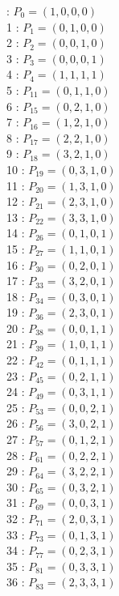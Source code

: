 \documentclass{article}
\begin{document}
{\begin{multicols}{3}
 : $P_{0}=( 1, 0, 0, 0 )$\\
1 : $P_{1}=( 0, 1, 0, 0 )$\\
2 : $P_{2}=( 0, 0, 1, 0 )$\\
3 : $P_{3}=( 0, 0, 0, 1 )$\\
4 : $P_{4}=( 1, 1, 1, 1 )$\\
5 : $P_{11}=( 0, 1, 1, 0 )$\\
6 : $P_{15}=( 0, 2, 1, 0 )$\\
7 : $P_{16}=( 1, 2, 1, 0 )$\\
8 : $P_{17}=( 2, 2, 1, 0 )$\\
9 : $P_{18}=( 3, 2, 1, 0 )$\\
10 : $P_{19}=( 0, 3, 1, 0 )$\\
11 : $P_{20}=( 1, 3, 1, 0 )$\\
12 : $P_{21}=( 2, 3, 1, 0 )$\\
13 : $P_{22}=( 3, 3, 1, 0 )$\\
14 : $P_{26}=( 0, 1, 0, 1 )$\\
15 : $P_{27}=( 1, 1, 0, 1 )$\\
16 : $P_{30}=( 0, 2, 0, 1 )$\\
17 : $P_{33}=( 3, 2, 0, 1 )$\\
18 : $P_{34}=( 0, 3, 0, 1 )$\\
19 : $P_{36}=( 2, 3, 0, 1 )$\\
20 : $P_{38}=( 0, 0, 1, 1 )$\\
21 : $P_{39}=( 1, 0, 1, 1 )$\\
22 : $P_{42}=( 0, 1, 1, 1 )$\\
23 : $P_{45}=( 0, 2, 1, 1 )$\\
24 : $P_{49}=( 0, 3, 1, 1 )$\\
25 : $P_{53}=( 0, 0, 2, 1 )$\\
26 : $P_{56}=( 3, 0, 2, 1 )$\\
27 : $P_{57}=( 0, 1, 2, 1 )$\\
28 : $P_{61}=( 0, 2, 2, 1 )$\\
29 : $P_{64}=( 3, 2, 2, 1 )$\\
30 : $P_{65}=( 0, 3, 2, 1 )$\\
31 : $P_{69}=( 0, 0, 3, 1 )$\\
32 : $P_{71}=( 2, 0, 3, 1 )$\\
33 : $P_{73}=( 0, 1, 3, 1 )$\\
34 : $P_{77}=( 0, 2, 3, 1 )$\\
35 : $P_{81}=( 0, 3, 3, 1 )$\\
36 : $P_{83}=( 2, 3, 3, 1 )$\\
\end{multicols}


}
\end{document}
